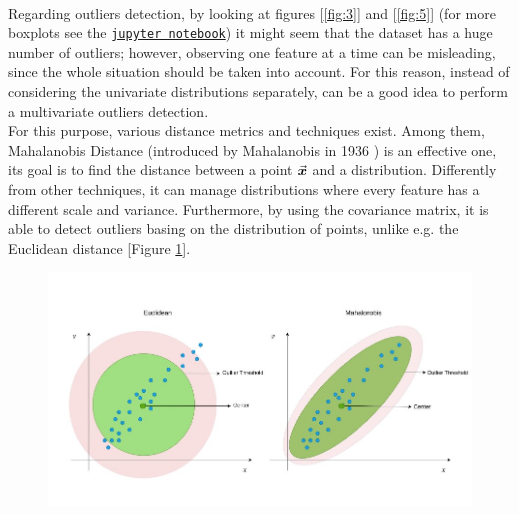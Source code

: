 \documentclass[letterpaper]{article}
\begin{document}
	\paragraph{} Regarding outliers detection, by looking at figures [\ref{fig:3}] and [\ref{fig:5}] (for more boxplots see the \href{https://nbviewer.jupyter.org/github/angelicaurba/south-german-credit-dataset/blob/main/dataset_analysis.ipynb}{\texttt{jupyter notebook}}) it might seem that the dataset has a huge number of outliers; however, observing one feature at a time can be misleading, since the whole situation should be taken into account. For this reason, instead of considering the univariate distributions separately, can be a good idea to perform a multivariate outliers detection. \\
	For this purpose, various distance metrics and techniques exist. Among them, Mahalanobis Distance (introduced by Mahalanobis in 1936 \cite{mahalanobis1936}) is an effective one, its goal is to find the distance between a point $ \va*{x} $ and a distribution. Differently from other techniques, it can manage distributions where every feature has a different scale and variance. Furthermore, by using the covariance matrix, it is able to detect outliers basing on the distribution of points, unlike e.g. the Euclidean distance [Figure \ref{fig:6}].
	\begin{figure}[h]
		\centering
		\includegraphics[width=.85\textwidth]{images/euclidean_vs_mahalanobis.jpeg}
		\label{fig:6}
	\end{figure}
	
\end{document}
